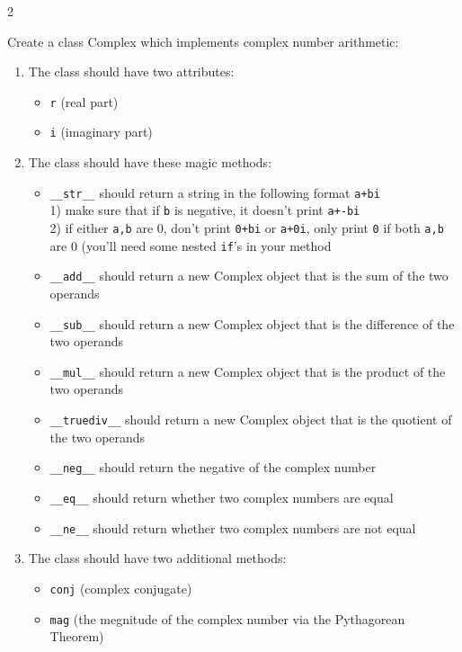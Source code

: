 \documentclass[12pt]{article}%
\newcommand{\code}[1]{\texttt{#1}}
\begin{document}
\begin{multicols*}{2}

\begin{Exercise}[origin={40 points, Python}]

Create a class Complex which implements complex number arithmetic:

\begin{enumerate}[leftmargin=*]
	\item The class should have two attributes:
	\begin{itemize}[leftmargin=*]
		\item \code{r} (real part)
		\item \code{i} (imaginary part)
	\end{itemize}
	\item The class should have these magic methods:
	\begin{itemize}[leftmargin=*]
		\item \code{\_\_str\_\_} should return a string in the following format \code{a+bi} \\
		1) make sure that if \code{b} is negative, it doesn't print \code{a+-bi} \\
		2) if either \code{a,b} are 0, don't print \code{0+bi} or \code{a+0i}, only print \code{0} if both \code{a,b} are 0 (you'll need some nested \code{if}'s in your method
		\item \code{\_\_add\_\_} should return a new Complex object that is the sum of the two operands
		\item \code{\_\_sub\_\_} should return a new Complex object that is the difference of the two operands
		\item \code{\_\_mul\_\_} should return a new Complex object that is the product of the two operands
		\item \code{\_\_truediv\_\_} should return a new Complex object that is the quotient of the two operands
		\item \code{\_\_neg\_\_} should return the negative of the complex number
		\item \code{\_\_eq\_\_} should return whether two complex numbers are equal
		\item \code{\_\_ne\_\_} should return whether two complex numbers are not equal
	\end{itemize}
	\item The class should have two additional methods:
	\begin{itemize}
		\item \code{conj} (complex conjugate)
		\item \code{mag} (the megnitude of the complex number via the Pythagorean Theorem)
	\end{itemize}
\end{enumerate}


\end{Exercise}
\end{multicols*}
\end{document}
